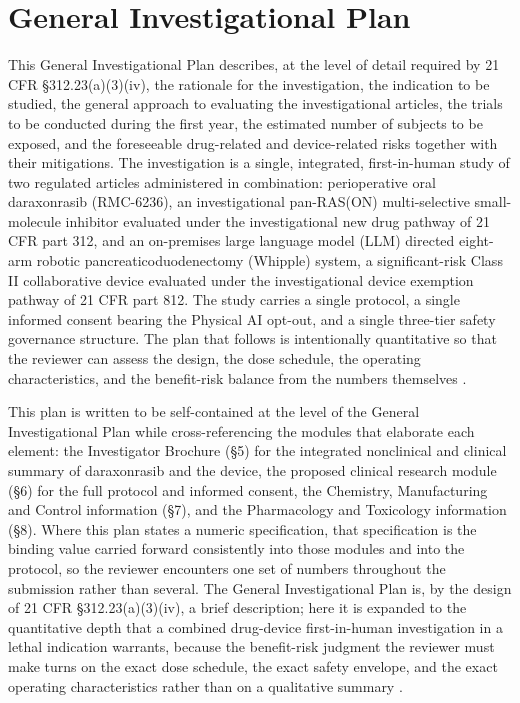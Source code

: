 \section{General Investigational Plan}

This General Investigational Plan describes, at the level of detail required by
21 CFR \S 312.23(a)(3)(iv), the rationale for the investigation, the indication to
be studied, the general approach to evaluating the investigational articles, the
trials to be conducted during the first year, the estimated number of subjects to
be exposed, and the foreseeable drug-related and device-related risks together with
their mitigations. The investigation is a single, integrated, first-in-human study
of two regulated articles administered in combination: perioperative oral
daraxonrasib (RMC-6236), an investigational pan-RAS(ON) multi-selective
small-molecule inhibitor evaluated under the investigational new drug pathway of
21 CFR part 312, and an on-premises large language model (LLM) directed eight-arm
robotic pancreaticoduodenectomy (Whipple) system, a significant-risk Class II
collaborative device evaluated under the investigational device exemption pathway
of 21 CFR part 812. The study carries a single protocol, a single informed consent
bearing the Physical AI opt-out, and a single three-tier safety governance
structure. The plan that follows is intentionally quantitative so that the reviewer
can assess the design, the dose schedule, the operating characteristics, and the
benefit-risk balance from the numbers themselves \cite{phase1guidance,daraxwhipple}.

This plan is written to be self-contained at the level of the General
Investigational Plan while cross-referencing the modules that elaborate each
element: the Investigator Brochure (\S 5) for the integrated nonclinical and
clinical summary of daraxonrasib and the device, the proposed clinical research
module (\S 6) for the full protocol and informed consent, the Chemistry,
Manufacturing and Control information (\S 7), and the Pharmacology and Toxicology
information (\S 8). Where this plan states a numeric specification, that
specification is the binding value carried forward consistently into those modules
and into the protocol, so the reviewer encounters one set of numbers throughout the
submission rather than several. The General Investigational Plan is, by the design
of 21 CFR \S 312.23(a)(3)(iv), a brief description; here it is expanded to the
quantitative depth that a combined drug-device first-in-human investigation in a
lethal indication warrants, because the benefit-risk judgment the reviewer must make
turns on the exact dose schedule, the exact safety envelope, and the exact
operating characteristics rather than on a qualitative summary
\cite{phase1guidance,onpremwhippl}.

